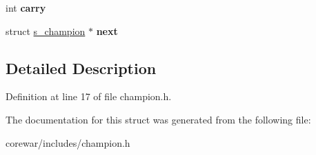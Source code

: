 \begin{DoxyCompactItemize}
\item 
\hypertarget{structs__champion_ac33dd0ad72380ad7b52434992811c5a7}{int {\bfseries carry}}\label{structs__champion_ac33dd0ad72380ad7b52434992811c5a7}

\item 
\hypertarget{structs__champion_a2d18ffa3b1babc703aa8b1cd3812f7ad}{struct \hyperlink{structs__champion}{s\-\_\-champion} $\ast$ {\bfseries next}}\label{structs__champion_a2d18ffa3b1babc703aa8b1cd3812f7ad}

\end{DoxyCompactItemize}


\subsection{Detailed Description}


Definition at line 17 of file champion.\-h.



The documentation for this struct was generated from the following file\-:\begin{DoxyCompactItemize}
\item 
corewar/includes/champion.\-h\end{DoxyCompactItemize}

